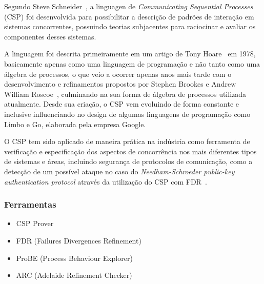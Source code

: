 Segundo Steve Schneider~\cite{Schneider:1999:CRT:555233}, a linguagen de \textit{Communicating Sequential Processes}
(CSP) foi desenvolvida para possibilitar a descrição de padrões de interação em sistemas concorrentes,
possuindo teorias subjacentes para raciocinar e avaliar os componentes desses sistemas.

A linguagem foi descrita primeiramente em um artigo de Tony Hoare~\cite{Hoare:1978:CSP:359576.359585} em 1978,
basicamente apenas como uma linguagem de programação e não tanto como uma álgebra de processos, o que veio a ocorrer
apenas anos mais tarde com o desenvolvimento e refinamentos propostos por Stephen Brookes e Andrew William Roscoe~\cite{Brookes:1984:TCS:828.833},
culminando na sua forma de álgebra de processos utilizada atualmente.
Desde sua criação, o CSP vem evoluindo de forma constante e inclusive influenciando no design de algumas linguagens
de programação como Limbo e Go, elaborada pela empresa Google.

O CSP tem sido aplicado de maneira prática na indústria como ferramenta de verificação e especificação dos aspectos
de concorrência nos mais diferentes tipos de sistemas e áreas, incluindo segurança de protocolos de comunicação,
como a detecção de um possível ataque no caso do \textit{Needham-Schroeder public-key authentication protocol}
através da utilização do CSP com FDR~\cite{Lowe:1996:BFN:646480.693776}.

\subsubsection{Ferramentas}

\begin{itemize}
\item{CSP Prover}
\item{FDR (Failures Divergences Refinement)}
\item{ProBE (Process Behaviour Explorer)}
\item{ARC (Adelaide Refinement Checker)}
\end{itemize}
